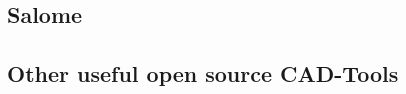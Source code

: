 %
%
%
%
%
%
%
%
%

\subsection{Salome}

\subsection{Other useful open source CAD-Tools}

\cleardoublepage
